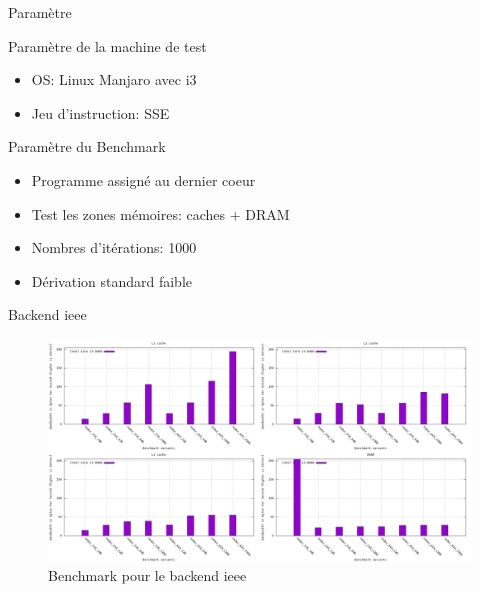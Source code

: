 \documentclass{beamer}
\begin{document}
\begin{frame}{Paramètre}

  \begin{block}{Paramètre de la machine de test}
    \begin{itemize}
    \item OS: Linux Manjaro avec i3
    \item Jeu d'instruction: SSE

    \end{itemize}
  \end{block}

  \begin{block}{Paramètre du Benchmark}
    \begin{itemize}
    \item Programme assigné au dernier coeur
    \item Test les zones mémoires: caches + DRAM
    \item Nombres d'itérations: 1000
    \item Dérivation standard faible
    \end{itemize}
  \end{block}

\end{frame}

\begin{frame}{Backend ieee}

  \begin{center}
    \begin{figure}
      \includegraphics[scale=0.2]{../ressources/ieee_bw.png}
      \caption{\label{fig:backend_ieee}Benchmark pour le backend ieee}
    \end{figure}
  \end{center}
  
\end{frame}
\end{document}
